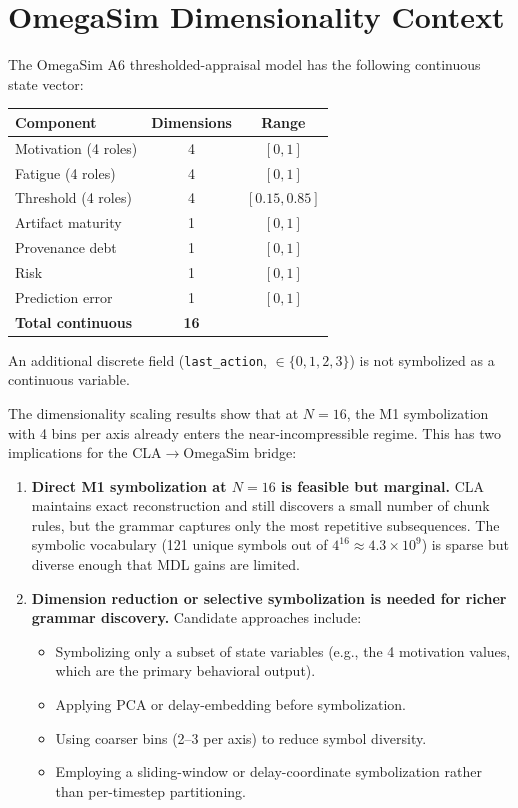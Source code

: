 \documentclass[11pt]{article}
\begin{document}
\section{OmegaSim Dimensionality Context}

The OmegaSim A6 thresholded-appraisal model has the following continuous state vector:

\begin{center}
\begin{tabular}{lcc}
\toprule
Component & Dimensions & Range \\
\midrule
Motivation (4 roles) & 4 & $[0, 1]$ \\
Fatigue (4 roles) & 4 & $[0, 1]$ \\
Threshold (4 roles) & 4 & $[0.15, 0.85]$ \\
Artifact maturity & 1 & $[0, 1]$ \\
Provenance debt & 1 & $[0, 1]$ \\
Risk & 1 & $[0, 1]$ \\
Prediction error & 1 & $[0, 1]$ \\
\midrule
\textbf{Total continuous} & \textbf{16} & \\
\bottomrule
\end{tabular}
\end{center}

An additional discrete field (\texttt{last\_action}, $\in \{0,1,2,3\}$) is not symbolized as a continuous variable.

The dimensionality scaling results show that at $N=16$, the M1 symbolization with 4 bins per axis already enters the near-incompressible regime. This has two implications for the CLA$\to$OmegaSim bridge:

\begin{enumerate}
    \item \textbf{Direct M1 symbolization at $N=16$ is feasible but marginal.} CLA maintains exact reconstruction and still discovers a small number of chunk rules, but the grammar captures only the most repetitive subsequences. The symbolic vocabulary (121 unique symbols out of $4^{16} \approx 4.3\times10^9$) is sparse but diverse enough that MDL gains are limited.
    \item \textbf{Dimension reduction or selective symbolization is needed for richer grammar discovery.} Candidate approaches include:
    \begin{itemize}[noitemsep]
        \item Symbolizing only a subset of state variables (e.g., the 4 motivation values, which are the primary behavioral output).
        \item Applying PCA or delay-embedding before symbolization.
        \item Using coarser bins (2--3 per axis) to reduce symbol diversity.
        \item Employing a sliding-window or delay-coordinate symbolization rather than per-timestep partitioning.
    \end{itemize}
\end{enumerate}
\end{document}
